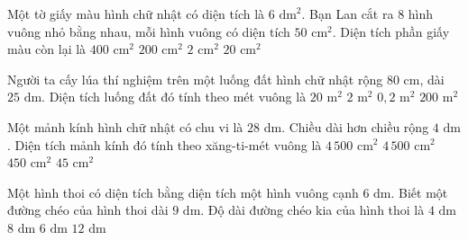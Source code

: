 \begin{ex} %
Một tờ giấy màu hình chữ nhật có diện tích là $6\text{ dm}^2$. Bạn Lan cắt ra $8$ hình vuông nhỏ bằng nhau, mỗi hình vuông có diện tích $50\text{ cm}^2$. Diện tích phần giấy màu còn lại là
\choice
{$400\text{ cm}^2$}
{\True $200\text{ cm}^2$}
{$2\text{ cm}^2$}
{$20\text{ cm}^2$}
\end{ex}

\begin{ex} %
Người ta cấy lúa thí nghiệm trên một luống đất hình chữ nhật rộng $80\text{ cm}$, dài $25\text{ dm}$. Diện tích luống đất đó tính theo mét vuông là
\choice
{$20\text{ m}^2$}
{\True $2\text{ m}^2$}
{$0{,}2\text{ m}^2$}
{$200\text{ m}^2$}
\end{ex}

\begin{ex} %
Một mảnh kính hình chữ nhật có chu vi là $28\text{ dm}$. Chiều dài hơn chiều rộng $4\text{ dm}$. Diện tích mảnh kính đó tính theo xăng-ti-mét vuông là
\choice
{$4\,500\text{ cm}^2$}
{\True $4\,500\text{ cm}^2$}
{$450\text{ cm}^2$}
{$45\text{ cm}^2$}
\end{ex}

\begin{ex} %
Một hình thoi có diện tích bằng diện tích một hình vuông cạnh $6\text{ dm}$. Biết một đường chéo của hình thoi dài $9\text{ dm}$. Độ dài đường chéo kia của hình thoi là
\choice
{$4\text{ dm}$}
{\True $8\text{ dm}$}
{$6\text{ dm}$}
{$12\text{ dm}$}
\end{ex}

